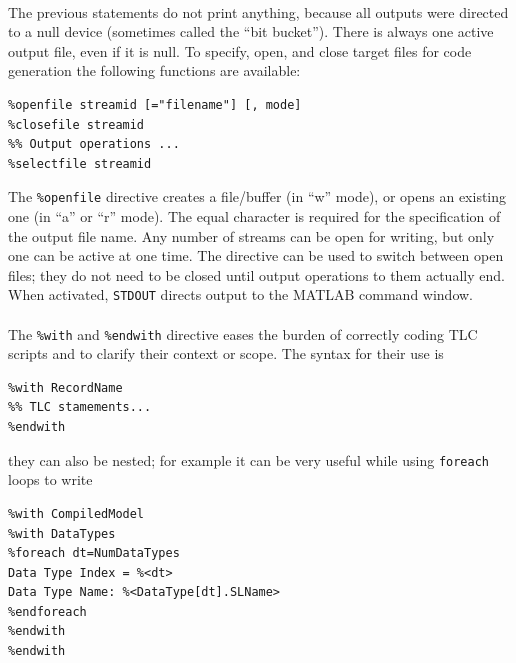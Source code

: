 \paragraph{} The previous statements do not print anything, because all outputs were directed to a null device (sometimes called the “bit bucket”). There is always one active output file, even if it is null. To specify, open, and close target files for code generation the following functions are available:
\begin{verbatim}
%openfile streamid [="filename"] [, mode]
%closefile streamid
%% Output operations ...
%selectfile streamid
\end{verbatim}
The \verb|%openfile| directive creates a file/buffer (in “w” mode), or opens an existing one (in “a” or “r” mode). The equal character is required for the specification of the output file name. Any number of streams can be open for writing, but only one can be active at one time. The directive can be used to switch between open files; they do not need to be closed until output operations to them actually end. When activated, \verb|STDOUT| directs output to the MATLAB command window.

\paragraph{} The \verb|%with| and \verb|%endwith| directive eases the burden of correctly coding TLC scripts and to clarify their context or scope. The syntax for their use is
\begin{verbatim}
%with RecordName
%% TLC stamements...
%endwith
\end{verbatim}
they can also be nested; for example it can be very useful while using \verb|foreach| loops to write
\begin{lstlisting}
%with CompiledModel
%with DataTypes
%foreach dt=NumDataTypes
Data Type Index = %<dt>
Data Type Name: %<DataType[dt].SLName>
%endforeach
%endwith
%endwith
\end{lstlisting}

